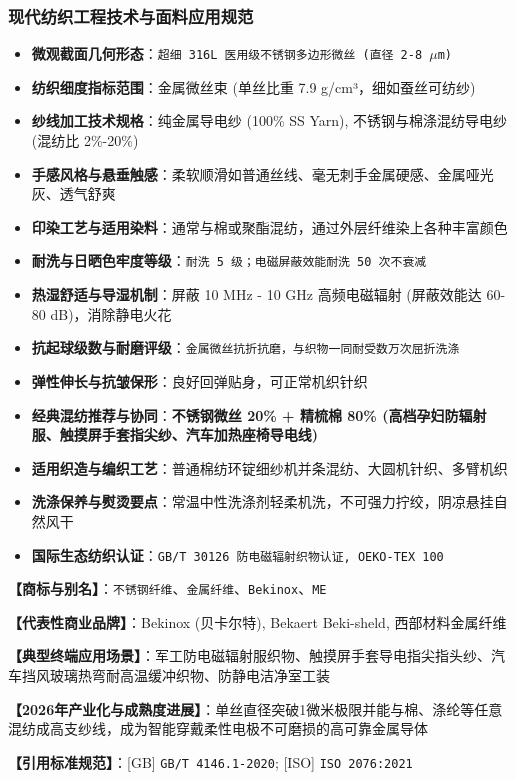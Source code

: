 \documentclass[11pt,openright,twoside,UTF8]{ctexbook}
\begin{document}
\subsubsection*{现代纺织工程技术与面料应用规范}
\begin{itemize} \setlength{\itemsep}{2pt}
    \item \textbf{微观截面几何形态}：\texttt{超细 316L 医用级不锈钢多边形微丝 (直径 2-8 $\mu$m)}
    \item \textbf{纺织细度指标范围}：金属微丝束 (单丝比重 7.9 g/cm³，细如蚕丝可纺纱)
    \item \textbf{纱线加工技术规格}：纯金属导电纱 (100\% SS Yarn), 不锈钢与棉涤混纺导电纱 (混纺比 2\%-20\%)
    \item \textbf{手感风格与悬垂触感}：柔软顺滑如普通丝线、毫无刺手金属硬感、金属哑光灰、透气舒爽
    \item \textbf{印染工艺与适用染料}：通常与棉或聚酯混纺，通过外层纤维染上各种丰富颜色
    \item \textbf{耐洗与日晒色牢度等级}：\texttt{耐洗 5 级；电磁屏蔽效能耐洗 50 次不衰减}
    \item \textbf{热湿舒适与导湿机制}：屏蔽 10 MHz - 10 GHz 高频电磁辐射 (屏蔽效能达 60-80 dB)，消除静电火花
    \item \textbf{抗起球级数与耐磨评级}：\texttt{金属微丝抗折抗磨，与织物一同耐受数万次屈折洗涤}
    \item \textbf{弹性伸长与抗皱保形}：良好回弹贴身，可正常机织针织
    \item \textbf{经典混纺推荐与协同}：\textbf{不锈钢微丝 20\% + 精梳棉 80\% (高档孕妇防辐射服、触摸屏手套指尖纱、汽车加热座椅导电线)}
    \item \textbf{适用织造与编织工艺}：普通棉纺环锭细纱机并条混纺、大圆机针织、多臂机织
    \item \textbf{洗涤保养与熨烫要点}：常温中性洗涤剂轻柔机洗，不可强力拧绞，阴凉悬挂自然风干
    \item \textbf{国际生态纺织认证}：\texttt{GB/T 30126 防电磁辐射织物认证, OEKO-TEX 100}
\end{itemize}
\vspace{0.2cm}

\noindent\textbf{【商标与别名】}：\texttt{不锈钢纤维}、\texttt{金属纤维}、\texttt{Bekinox}、\texttt{ME}\par
\noindent\textbf{【代表性商业品牌】}：Bekinox (贝卡尔特), Bekaert Beki-sheld, 西部材料金属纤维\par
\noindent\textbf{【典型终端应用场景】}：军工防电磁辐射服织物、触摸屏手套导电指尖指头纱、汽车挡风玻璃热弯耐高温缓冲织物、防静电洁净室工装\par
\noindent\textbf{【2026年产业化与成熟度进展】}：单丝直径突破1微米极限并能与棉、涤纶等任意混纺成高支纱线，成为智能穿戴柔性电极不可磨损的高可靠金属导体\par
\noindent\textbf{【引用标准规范】}：[GB] \texttt{GB/T 4146.1-2020}; [ISO] \texttt{ISO 2076:2021}\par
\vspace{0.5cm}
\end{document}

